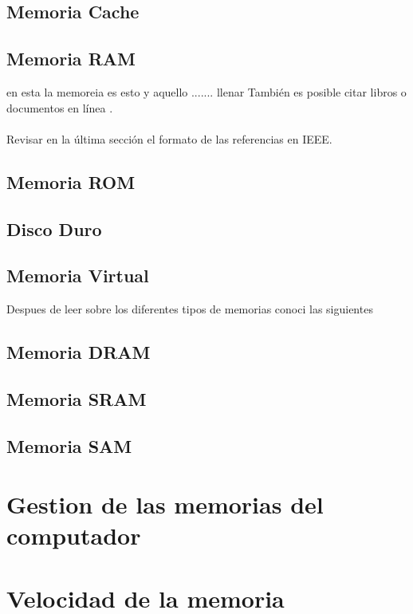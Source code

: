 \documentclass{article}
\begin{document}
	\subsection{Memoria Cache}
	
	
	\subsection{Memoria RAM}
	en esta la memoreia es esto y aquello ....... llenar
	También es posible citar libros \cite{dirac} o documentos en línea \cite{knuthwebsite}.\\\\
	Revisar en la última sección el formato de las referencias en IEEE.
	
	\subsection{Memoria ROM}
	
	
	\subsection{Disco Duro}
	
	\subsection{Memoria Virtual}
	
	Despues de leer sobre los diferentes tipos de memorias conoci las siguientes
	
	\subsection{Memoria DRAM}
	
	\subsection{Memoria SRAM}
	
	\subsection{Memoria SAM}
	
	
	\section{Gestion de las memorias del computador} \label{contenido}
	\section{Velocidad de la memoria}
	
	
	
	
\end{document}
